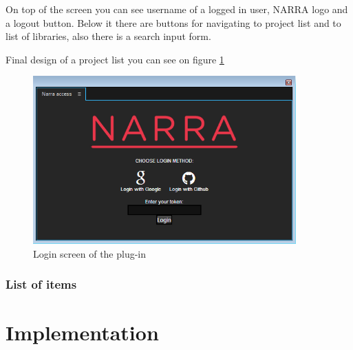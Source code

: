 \documentclass[thesis=B,english]{FITthesis}[2012/10/20]
\begin{document}
On top of the screen you can see username of a logged in user, NARRA logo and a logout button. Below it there are buttons for navigating to project list and to list of libraries, also there is a search input form.

Final design of a project list you can see on figure \ref{fig:projects}
	\begin{figure}
		\centering
		\includegraphics[width=0.9\textwidth]{LoginPage.png}
		\caption{Login screen of the plug-in}\label{fig:projects}
	\end{figure}
\subsection{List of items}
\chapter{Implementation}
\end{document}
